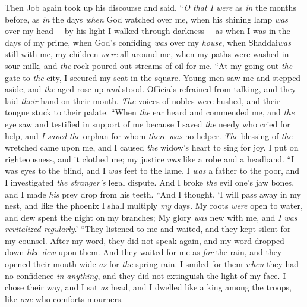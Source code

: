 \begin{biblechapter} %
 Then Job again took up his discourse and said,
\verse “\textit{O that I were} as \textit{in} the months before, 
as \textit{in} the days \textit{when} God watched over me,
\verse when his shining lamp \textit{was} over my head— 
by his light I walked through darkness—
\verse as when I was in the days of my prime, 
when God’s confiding \textit{was} over my \textit{house},
\verse when Shaddai\textit{was} still with me, 
my children \textit{were} all around me,
\verse when my paths were washed in sour milk, 
and \textit{the} rock poured out streams of oil for me.
\verse “At my going out \textit{the} gate to \textit{the} city, 
I secured my seat in the square.
\verse Young men saw me and stepped aside, 
and \textit{the} aged rose up \textit{and} stood.
\verse Officials refrained from talking, 
and they laid \textit{their} hand on their mouth.
\verse \textit{The} voices of nobles were hushed, 
and their tongue stuck to their palate.
\verse “When \textit{the} ear heard and commended me, 
and \textit{the} eye saw and testified in support of me
\verse because I saved \textit{the} needy who cried for help, 
and \textit{I saved} \textit{the} orphan for whom \textit{there was} no helper.
\verse \textit{The} blessing of \textit{the} wretched came upon me, 
and I caused \textit{the} widow’s heart to sing for joy.
\verse I put on righteousness, and it clothed me; 
my justice \textit{was} like a robe and a headband.
\verse “I was eyes to the blind, 
and I \textit{was} feet to the lame.
\verse I \textit{was} a father to the poor, 
and I investigated \textit{the stranger’s} legal dispute.
\verse And I broke \textit{the} evil one’s jaw bones, 
and I made \textit{his} prey drop from his teeth.
\verse “And I thought, ‘I will pass away in my nest, 
and like the phoenix I shall multiply \textit{my} days.
\verse My roots \textit{were} open to water, 
and dew spent the night on my branches;
\verse My glory \textit{was} new with me, 
and \textit{I was revitalized regularly}.’
\verse “They listened to me and waited, 
and they kept silent for my counsel.
\verse After my word, they did not speak again, 
and my word dropped down \textit{like dew} upon them.
\verse And they waited for me as \textit{for} the rain, 
and they opened their mouth wide \textit{as} for \textit{the} spring rain.
\verse I smiled for them \textit{when} they had no confidence \textit{in anything}, 
and they did not extinguish the light of my face.
\verse I chose their way, and I sat \textit{as} head, 
and I dwelled like a king among the troops, 
like \textit{one} who comforts mourners.
\end{biblechapter}

